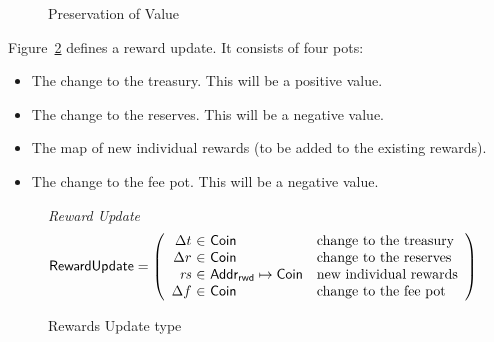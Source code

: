 \begin{figure}[htb]
  \begin{center}
  \end{center}
  \caption{Preservation of Value}
  \label{fig:fund-preservation}
\end{figure}

Figure~\ref{fig:defs:reward-update} defines a reward update.
It consists of four pots:
\begin{itemize}
  \item The change to the treasury. This will be a positive value.
  \item The change to the reserves. This will be a negative value.
  \item The map of new individual rewards (to be added to the existing rewards).
  \item The change to the fee pot. This will be a negative value.
\end{itemize}

\begin{figure}[htb]
  \emph{Reward Update}
  \begin{equation*}
    \RewardUpdate =
    \left(
      \begin{array}{r@{~\in~}ll}
        \Delta t & \Coin & \text{change to the treasury} \\
        \Delta r & \Coin & \text{change to the reserves} \\
        \var{rs} & \AddrRWD\mapsto\Coin & \text{new individual rewards} \\
        \Delta f & \Coin & \text{change to the fee pot} \\
      \end{array}
    \right)
  \end{equation*}
  \caption{Rewards Update type}
  \label{fig:defs:reward-update}
\end{figure}

